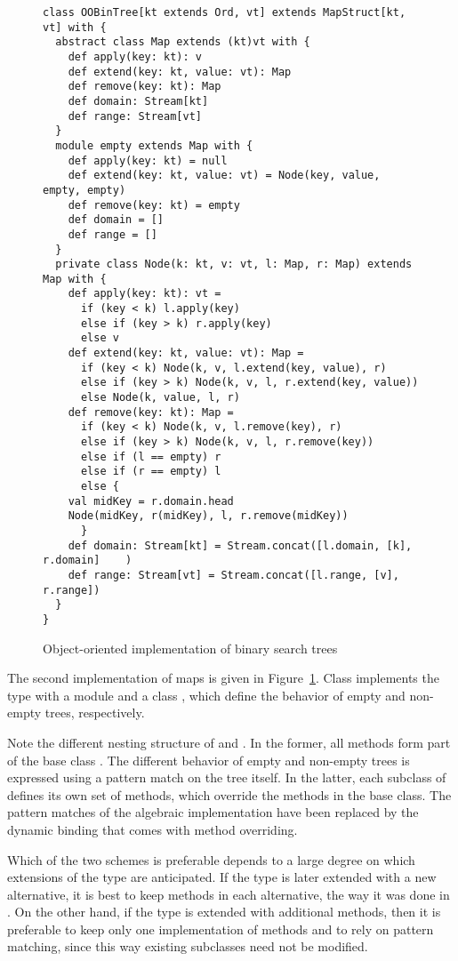 \documentclass[11pt]{report}
\begin{document}
{\begin{figure}[thb]
\begin{verbatim}
class OOBinTree[kt extends Ord, vt] extends MapStruct[kt, vt] with {
  abstract class Map extends (kt)vt with {
    def apply(key: kt): v
    def extend(key: kt, value: vt): Map
    def remove(key: kt): Map
    def domain: Stream[kt]
    def range: Stream[vt]
  }
  module empty extends Map with {
    def apply(key: kt) = null
    def extend(key: kt, value: vt) = Node(key, value, empty, empty)
    def remove(key: kt) = empty
    def domain = []
    def range = []
  }
  private class Node(k: kt, v: vt, l: Map, r: Map) extends Map with {
    def apply(key: kt): vt =
      if (key < k) l.apply(key)
      else if (key > k) r.apply(key)
      else v
    def extend(key: kt, value: vt): Map =
      if (key < k) Node(k, v, l.extend(key, value), r)
      else if (key > k) Node(k, v, l, r.extend(key, value))
      else Node(k, value, l, r)
    def remove(key: kt): Map =
      if (key < k) Node(k, v, l.remove(key), r)
      else if (key > k) Node(k, v, l, r.remove(key))
      else if (l == empty) r
      else if (r == empty) l
      else {
	val midKey = r.domain.head
	Node(midKey, r(midKey), l, r.remove(midKey))
      }
    def domain: Stream[kt] = Stream.concat([l.domain, [k], r.domain]	)
    def range: Stream[vt] = Stream.concat([l.range, [v], r.range])
  }
}
\end{verbatim}
\caption{\label{fig:oobintree}Object-oriented implementation of binary
search trees}
\end{figure}

The second implementation of maps is given in
Figure~\ref{fig:oobintree}.  Class \verb@OOBinTree@ implements the
type \verb@Map@ with a module \verb@empty@ and a class
\verb@Node@, which define the behavior of empty and non-empty trees,
respectively.

Note the different nesting structure of \verb@AlgBinTree@ and
\verb@OOBinTree@. In the former, all methods form part of the base
class \verb@Map@. The different behavior of empty and non-empty trees
is expressed using a pattern match on the tree itself. In the
latter, each subclass of \verb@Map@ defines its own set of
methods, which override the methods in the base class. The pattern
matches of the algebraic implementation have been replaced by the
dynamic binding that comes with method overriding.

Which of the two schemes is preferable depends to a large degree on
which extensions of the type are anticipated. If the type is later
extended with a new alternative, it is best to keep methods in each
alternative, the way it was done in \verb@OOBinTree@.  On the other
hand, if the type is extended with additional methods, then it is
preferable to keep only one implementation of methods and to rely on
pattern matching, since this way existing subclasses need not be
modified.

}
\end{document}
